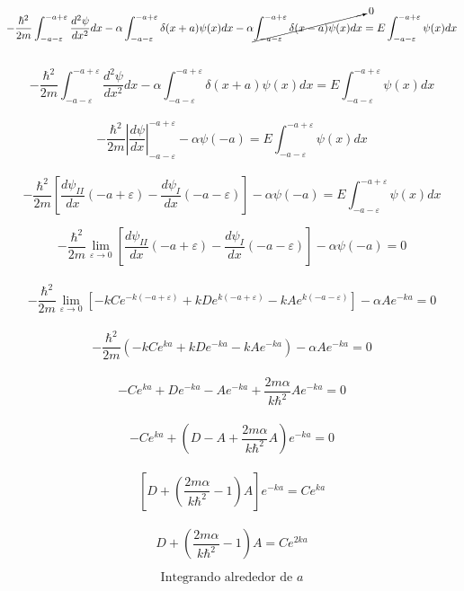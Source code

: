 \documentclass[10pt,a4papper]{article}
\begin{document}
\[-\frac{\hbar^2}{2m}\int_{-a-\varepsilon}^{-a+\varepsilon}\frac{d^2\psi}{dx^2}dx
-\alpha\int_{-a-\varepsilon}^{-a+\varepsilon}\delta(x+a)\psi(x)dx
-\alpha\cancelto{0}{\int_{-a-\varepsilon}^{-a+\varepsilon}\delta(x-a)\psi(x)dx}=
E\int_{-a-\varepsilon}^{-a+\varepsilon}\psi(x)dx\]\\

\[-\frac{\hbar^2}{2m}\int_{-a-\varepsilon}^{-a+\varepsilon}\frac{d^2\psi}{dx^2}dx
-\alpha\int_{-a-\varepsilon}^{-a+\varepsilon}\delta(x+a)\psi(x)dx=
E\int_{-a-\varepsilon}^{-a+\varepsilon}\psi(x)dx\]\\

\[-\frac{\hbar^2}{2m}\left|\frac{d\psi}{dx}\right|_{-a-\varepsilon}^{-a+\varepsilon}
-\alpha\psi(-a)=
E\int_{-a-\varepsilon}^{-a+\varepsilon}\psi(x)dx\]\\

\[-\frac{\hbar^2}{2m}\left[\frac{d\psi_{II}}{dx}(-a+\varepsilon)-\frac{d\psi_I}{dx}(-a-\varepsilon)\right]
-\alpha\psi(-a)=
E\int_{-a-\varepsilon}^{-a+\varepsilon}\psi(x)dx\]

\newpage
\[-\frac{\hbar^2}{2m}\lim_{\varepsilon\to 0}\left[\frac{d\psi_{II}}{dx}(-a+\varepsilon)-\frac{d\psi_I}{dx}(-a-\varepsilon)\right]
-\alpha\psi(-a)=0\]\\

\[-\frac{\hbar^2}{2m}\lim_{\varepsilon\to 0}\left[-kCe^{-k(-a+\varepsilon)}+kDe^{k(-a+\varepsilon)}-
  kAe^{k(-a-\varepsilon)}\right]
-\alpha Ae^{-ka}=0\]\\

\[-\frac{\hbar^2}{2m}\left(-kCe^{ka}+kDe^{-ka}-kAe^{-ka}\right)-\alpha Ae^{-ka}=0\]\\

\[-Ce^{ka}+De^{-ka}-Ae^{-ka}+\frac{2m\alpha}{k\hbar^2}Ae^{-ka}=0\]\\

\[-Ce^{ka}+\left(D-A+\frac{2m\alpha}{k\hbar^2}A\right)e^{-ka}=0\]\\

\[\left[D+\left(\frac{2m\alpha}{k\hbar^2}-1\right)A\right]e^{-ka}=Ce^{ka}\]\\

\[\boxed{D+\left(\frac{2m\alpha}{k\hbar^2}-1\right)A=Ce^{2ka}}\]

\newpage
\[\text{Integrando alrededor de }a\]

\begin{center}
\end{center}\\
\end{document}
